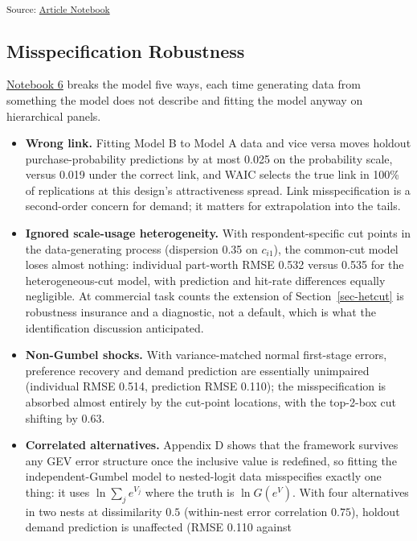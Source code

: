 \documentclass[
  letterpaper,
  DIV=11,
  numbers=noendperiod]{scrartcl}
\providecommand{\tightlist}{%
  \setlength{\itemsep}{0pt}\setlength{\parskip}{0pt}}
\theoremstyle{plain}
\theoremstyle{plain}
\theoremstyle{remark}
\begin{document}
\textsubscript{Source:
\href{https://dyavorsky.github.io/ordinalDualresponse_paper/index.qmd.html}{Article
Notebook}}

\subsection{Misspecification Robustness}\label{sec-sim-robust}

\href{notebooks/06-misspecification.qmd}{Notebook 6} breaks the model
five ways, each time generating data from something the model does not
describe and fitting the model anyway on hierarchical panels.

\begin{itemize}
\tightlist
\item
  \textbf{Wrong link.} Fitting Model B to Model A data and vice versa
  moves holdout purchase-probability predictions by at most 0.025 on the
  probability scale, versus 0.019 under the correct link, and WAIC
  selects the true link in 100\% of replications at this design's
  attractiveness spread. Link misspecification is a second-order concern
  for demand; it matters for extrapolation into the tails.
\item
  \textbf{Ignored scale-usage heterogeneity.} With respondent-specific
  cut points in the data-generating process (dispersion 0.35 on
  \(c_{i1}\)), the common-cut model loses almost nothing: individual
  part-worth RMSE 0.532 versus 0.535 for the heterogeneous-cut model,
  with prediction and hit-rate differences equally negligible. At
  commercial task counts the extension of Section~\ref{sec-hetcut} is
  robustness insurance and a diagnostic, not a default, which is what
  the identification discussion anticipated.
\item
  \textbf{Non-Gumbel shocks.} With variance-matched normal first-stage
  errors, preference recovery and demand prediction are essentially
  unimpaired (individual RMSE 0.514, prediction RMSE 0.110); the
  misspecification is absorbed almost entirely by the cut-point
  locations, with the top-2-box cut shifting by 0.63.
\item
  \textbf{Correlated alternatives.} Appendix D shows that the framework
  survives any GEV error structure once the inclusive value is
  redefined, so fitting the independent-Gumbel model to nested-logit
  data misspecifies exactly one thing: it uses \(\ln \sum_j e^{V_j}\)
  where the truth is \(\ln G(e^{V})\). With four alternatives in two
  nests at dissimilarity \(0.5\) (within-nest error correlation
  \(0.75\)), holdout demand prediction is unaffected (RMSE 0.110 against

\end{itemize}
\end{document}
